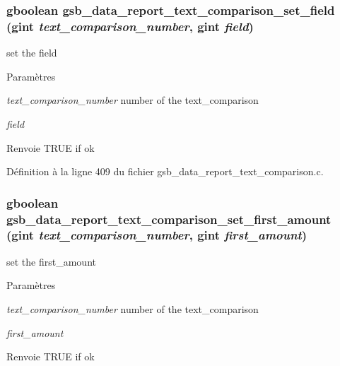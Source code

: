 \subsubsection[{gsb\_\-data\_\-report\_\-text\_\-comparison\_\-set\_\-field}]{\setlength{\rightskip}{0pt plus 5cm}gboolean gsb\_\-data\_\-report\_\-text\_\-comparison\_\-set\_\-field (gint {\em text\_\-comparison\_\-number}, \/  gint {\em field})}\label{gsb__data__report__text__comparison_8c_aa1130b73bb1c2a7ddfa74a2942f6a159}
set the field


\begin{DoxyParams}{Paramètres}
\item[{\em text\_\-comparison\_\-number}]number of the text\_\-comparison \item[{\em field}]\end{DoxyParams}
\begin{DoxyReturn}{Renvoie}
TRUE if ok 
\end{DoxyReturn}


Définition à la ligne 409 du fichier gsb\_\-data\_\-report\_\-text\_\-comparison.c.

\subsubsection[{gsb\_\-data\_\-report\_\-text\_\-comparison\_\-set\_\-first\_\-amount}]{\setlength{\rightskip}{0pt plus 5cm}gboolean gsb\_\-data\_\-report\_\-text\_\-comparison\_\-set\_\-first\_\-amount (gint {\em text\_\-comparison\_\-number}, \/  gint {\em first\_\-amount})}\label{gsb__data__report__text__comparison_8c_a76926aaf68882b238b0555f7cdb26ffc}
set the first\_\-amount


\begin{DoxyParams}{Paramètres}
\item[{\em text\_\-comparison\_\-number}]number of the text\_\-comparison \item[{\em first\_\-amount}]\end{DoxyParams}
\begin{DoxyReturn}{Renvoie}
TRUE if ok 
\end{DoxyReturn}


